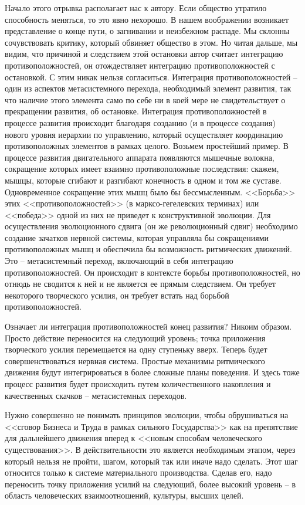 \documentclass{book}
\begin{document}
Начало этого отрывка располагает нас к автору. Если обще­ство утратило способность меняться, то это явно нехорошо. В нашем воображении возникает представление о конце пути, о загнивании и неизбежном распаде. Мы склонны сочувство­вать критику, который обвиняет общество в этом. Но читая дальше, мы видим, что причиной и следствием этой остановки автор считает интеграцию противоположностей, он отождест­вляет интеграцию противоположностей с остановкой. С этим никак нельзя согласиться. Интеграция противоположностей -- один из аспектов метасистемного перехода, необходимый эле­мент развития, так что наличие этого элемента само по себе ни в коей мере не свидетельствует о прекращении развития, об остановке. Интеграция противоположностей в процессе раз­вития происходит благодаря созданию (и в процессе создания) нового уровня иерархии по управлению, который осуществля­ет координацию противоположных элементов в рамках целого. Возьмем простейший пример. В процессе развития двигатель­ного аппарата появляются мышечные 
волокна, сокращение ко­торых имеет взаимно противоположные последствия: скажем, мышцы, которые сгибают и разгибают конечность в одном и том же суставе. Одновременное сокращение этих мышц было бы бессмысленным. <<Борьба>> этих <<противоположностей>> (в марксо-гегелевских терминах) или <<победа>> одной из них не приведет к конструктивной эволюции. Для осуществления эволюционного сдвига (он же революционный сдвиг) необхо­димо создание зачатков нервной системы, которая управляла бы сокращениями противоположных мышц и обеспечила бы возможность ритмических движений. Это -- метасистемный переход, включающий в себя интеграцию противоположностей. Он происходит в контексте  борьбы противоположностей, но отнюдь не сводится  к ней и не является ее прямым следствием. Он требует некоторого творческого усилия, он требует встать над  борьбой противоположностей.

Означает ли интеграция противоположностей конец разви­тия? Никоим образом. Просто действие переносится на следу­ющий уровень; точка приложения творческого усилия переме­щается на одну ступеньку вверх. Теперь будет совершенство­ваться нервная система. Простые механизмы ритмического движения будут интегрироваться в более сложные планы по­ведения. И здесь тоже процесс развития будет происходить пу­тем количественного накопления и качественных скачков -- метасистемных переходов.

Нужно совершенно не понимать принципов эволюции, что­бы обрушиваться на <<сговор Бизнеса и Труда в рамках силь­ного Государства>> как на препятствие для дальнейшего дви­жения вперед к <<новым способам человеческого существова­ния>>. В действительности это является необходимым этапом, через который нельзя не пройти, шагом, который так или ина­че надо сделать. Этот шаг относится только к системе матери­ального производства. Сделав его, надо переносить точку при­ложения усилий на следующий, более высокий уровень -- в об­ласть человеческих взаимоотношений, культуры, высших целей.
\end{document}
